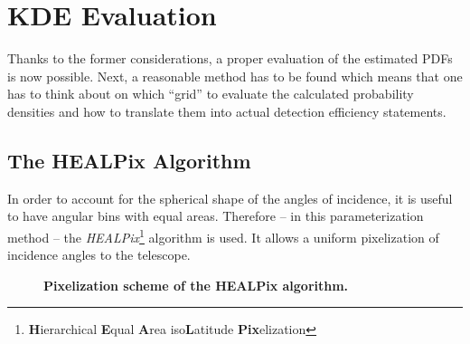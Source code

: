 \section{KDE Evaluation}

Thanks to the former considerations, a proper evaluation of the estimated PDFs is now possible. Next, a reasonable method has to be found which means that one has to think about on which \enquote{grid} to evaluate the calculated probability densities and how to translate them into actual detection efficiency statements.

\subsection{The HEALPix Algorithm}\label{sec:healpix}

In order to account for the spherical shape of the angles of incidence, it is useful to have angular bins with equal areas. Therefore -- in this parameterization method -- the \textit{HEALPix}\footnote{\textbf{H}ierarchical \textbf{E}qual \textbf{A}rea iso\textbf{L}atitude \textbf{Pix}elization} algorithm is used. It allows a uniform pixelization of incidence angles to the telescope.\\

\begin{figure}[H]
	\centering
	\begin{subfigure}[t]{0.48\textwidth}
		\centering
		\label{}
	\end{subfigure}
	\hfill
	\begin{subfigure}[t]{0.48\textwidth}
		\centering
		\usebox{\savedimage}
		\label{}
	\end{subfigure}
	\caption[Pixelization scheme of the HEALPix algorithm]{\textbf{Pixelization scheme of the HEALPix algorithm.} \cite[adapted]{healpix:paper}}
	\label{healpix:pixelization}
\end{figure}

